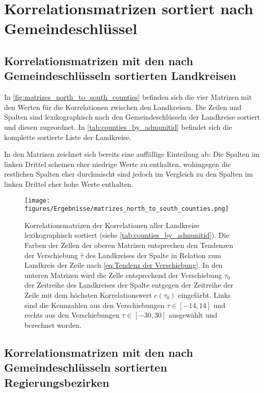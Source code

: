 \section{Korrelationsmatrizen sortiert nach Gemeindeschlüssel}
\subsection{Korrelationsmatrizen mit den nach Gemeindeschlüsseln sortierten Landkreisen}\label{sec:Durchführung:Korrelationsmatrizen mit den nach Gemeindeschlüsseln sortierten Landkreisen}
In \autoref{fig:matrizes_north_to_south_counties} befinden sich die vier Matrizen mit den Werten für die Korrelationen zwischen den Landkreisen.
Die Zeilen und Spalten sind lexikographisch nach den Gemeindeschlüsseln der Landkreise sortiert und diesen zugeordnet. In \autoref{tab:counties_by_admunitid} befindet sich die komplette sortierte Liste der Landkreise.

In den Matrizen zeichnet sich bereits eine auffällige Einteilung ab: Die Spalten im linken Drittel scheinen eher niedrige Werte zu enthalten, wohingegen die restlichen Spalten eher durchmischt sind jedoch im Vergleich zu den Spalten im linken Drittel eher hohe Werte enthalten.
\begin{figure}[H]
    \centering
    \texttt{[image: figures/Ergebnisse/matrizes\_north\_to\_south\_counties.png]}
    \caption{Korrelationsmatrizen der Korrelationen aller Landkreise lexikographisch sortiert (siehe \autoref{tab:counties_by_admunitid}). Die Farben der Zellen der oberen Matrizen entsprechen den Tendenzen der Verschiebung $\hat{\tau}$ des Landkreises der Spalte in Relation zum Landkreis der Zeile nach \autoref{eq:Tendenz der Verschiebung}. 
    In den unteren Matrizen wird die Zelle entsprechend der Verschiebung $\tau_0$ der Zeitreihe des Landkreises der Spalte entgegen der Zeitreihe der Zeile mit dem höchsten Korrelationswert $c(\tau_0)$ eingefärbt. Links sind die Kennzahlen aus den Verschiebungen $\tau\in[-14,14]$ und rechts aus den Verschiebungen $\tau\in[-30,30]$ ausgewählt und berechnet worden.
    }
    \label{fig:matrizes_north_to_south_counties}
\end{figure}
\subsection{Korrelationsmatrizen mit den nach Gemeindeschlüsseln sortierten Regierungsbezirken}\label{sec:Durchführung:Korrelationsmatrizen mit den nach Gemeindeschlüsseln sortierten Regierungsbezirken}

